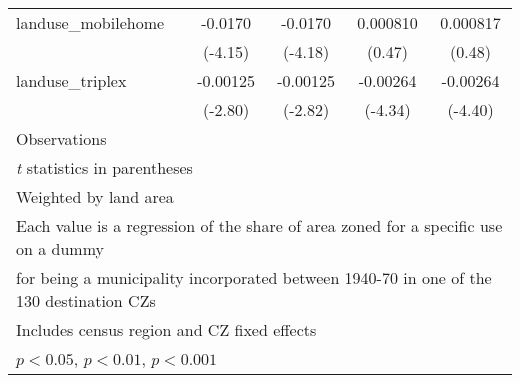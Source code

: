 \begin{table}[htbp]
\begin{tabular}{l*{4}{c}}
\addlinespace
landuse\_mobilehome  &     -0.0170\sym{***}&     -0.0170\sym{***}&    0.000810         &    0.000817         \\
                    &     (-4.15)         &     (-4.18)         &      (0.47)         &      (0.48)         \\
\addlinespace
landuse\_triplex     &    -0.00125\sym{**} &    -0.00125\sym{**} &    -0.00264\sym{***}&    -0.00264\sym{***}\\
                    &     (-2.80)         &     (-2.82)         &     (-4.34)         &     (-4.40)         \\
\midrule
Observations        &                     &                     &                     &                     \\
\bottomrule
\multicolumn{5}{l}{\footnotesize \textit{t} statistics in parentheses}\\
\multicolumn{5}{l}{\footnotesize Weighted by land area}\\
\multicolumn{5}{l}{\footnotesize Each value is a regression of the share of area zoned for a specific use on a dummy}\\
\multicolumn{5}{l}{\footnotesize for being a municipality incorporated between 1940-70 in one of the 130 destination CZs}\\
\multicolumn{5}{l}{\footnotesize Includes census region and CZ fixed effects}\\
\multicolumn{5}{l}{\footnotesize \sym{*} \(p<0.05\), \sym{**} \(p<0.01\), \sym{***} \(p<0.001\)}\\
\end{tabular}
\end{table}
